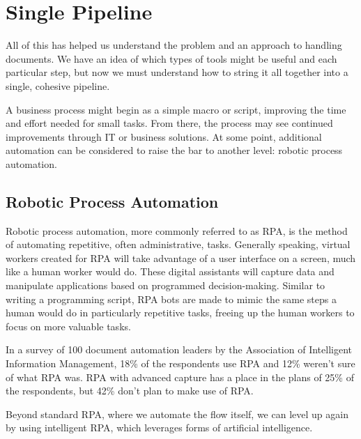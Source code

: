 \documentclass[conference]{IEEEtran}
\begin{document}
\section{Single Pipeline}
All of this has helped us understand the problem and an approach to handling documents. We have an idea of which types of tools might be useful and each particular step, but now we must understand how to string it all together into a single, cohesive pipeline.

A business process might begin as a simple macro or script, improving the time and effort needed for small tasks. From there, the process may see continued improvements through IT or business solutions. At some point, additional automation can be considered to raise the bar to another level: robotic process automation.

\subsection{Robotic Process Automation}
Robotic process automation, more commonly referred to as RPA, is the method of automating repetitive, often administrative, tasks. Generally speaking, virtual workers created for RPA will take advantage of a user interface on a screen, much like a human worker would do. These digital assistants will capture data and manipulate applications based on programmed decision-making. Similar to writing a programming script, RPA bots are made to mimic the same steps a human would do in particularly repetitive tasks, freeing up the human workers to focus on more valuable tasks.

In a survey of 100 document automation leaders by the Association of Intelligent Information Management, 18\% of the respondents use RPA and 12\% weren't sure of what RPA was. RPA with advanced capture has a place in the plans of 25\% of the respondents, but 42\% don't plan to make use of RPA. \cite{hollander2019survey}

Beyond standard RPA, where we automate the flow itself, we can level up again by using intelligent RPA, which leverages forms of artificial intelligence.
\end{document}
